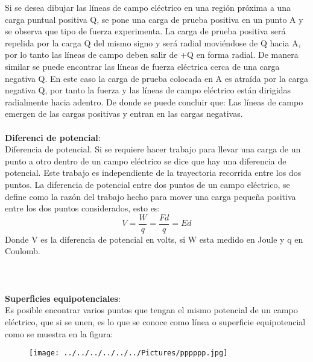 \documentclass[11pt,a4paper]{article}
\begin{document}
Si se desea dibujar las l\'{i}neas de campo el\'{e}ctrico en una regi\'{o}n pr\'{o}xima a una carga puntual positiva Q, se pone una carga de prueba positiva en un punto A y se observa que tipo de fuerza experimenta. La carga de prueba positiva ser\'{a} repelida por la carga Q del mismo signo y ser\'{a} radial movi\'{e}ndose de Q hacia A, por lo tanto las l\'{i}neas de campo deben salir de +Q en forma radial. De manera similar se puede encontrar las l\'{i}neas de fuerza el\'{e}ctrica cerca de una carga negativa Q. En este caso la carga de prueba colocada en A es atra\'{i}da por la carga negativa Q, por tanto la fuerza y las l\'{i}neas de campo el\'{e}ctrico est\'{a}n dirigidas radialmente hacia adentro. De donde se puede concluir que: Las l\'{i}neas de campo emergen de las cargas positivas y entran en las cargas negativas.
\\
\\
\textbf{Diferenci de potencial}:\\
Diferencia de potencial. Si se requiere hacer trabajo para llevar una carga de un punto a otro dentro de un campo el\'{e}ctrico se dice que hay una diferencia de potencial. Este trabajo es independiente de la trayectoria recorrida entre los dos puntos. La diferencia de potencial entre dos puntos de un campo el\'{e}ctrico, se define como la raz\'{o}n del trabajo hecho para mover una carga peque\~{n}a positiva entre los dos puntos considerados, esto es:
\[V=\frac { W }{ q } =\frac { Fd }{ q } =Ed\]
Donde V es la diferencia de potencial en volts, si W esta medido en Joule y q en Coulomb.\\
\\
\\
\\
\textbf{Superficies equipotenciales}:\\
Es posible encontrar varios puntos que tengan el mismo potencial de un campo el\'{e}ctrico, que si se unen, es lo que se conoce como l\'{i}nea o superficie equipotencial como se muestra en la figura:
\\
\begin{figure}[hbtp]
\centering
\texttt{[image: ../../../../../../Pictures/pppppp.jpg]}
\end{figure}

\\

\end{document}
